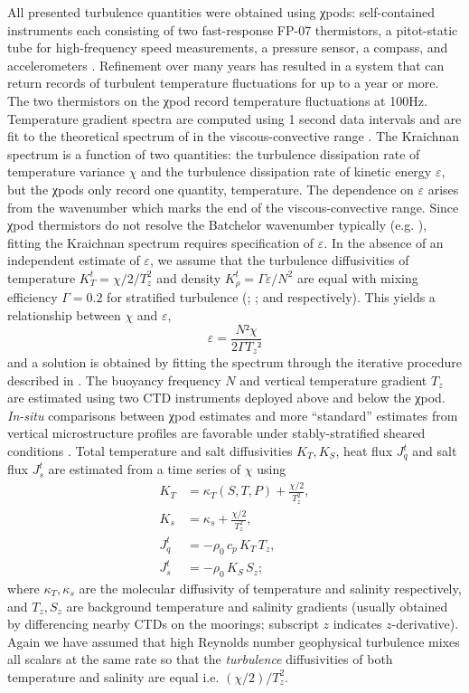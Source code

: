 \documentclass[onecol]{ametsoc}
\begin{document}
All presented turbulence quantities were obtained using χpods: self-contained instruments each consisting of two fast-response FP-07 thermistors, a pitot-static tube for high-frequency speed measurements, a pressure sensor, a compass, and accelerometers \citep{Moum2009a,Moum2015}.
Refinement over many years has resulted in a system that can return records of turbulent temperature fluctuations for up to a year or more.
The two thermistors on the χpod record temperature fluctuations at 100Hz.
Temperature gradient spectra are computed using 1 second data intervals and are fit to the theoretical spectrum of \cite{Kraichnan1968} in the viscous-convective range \citep{Moum2009a}.
The Kraichnan spectrum is a function of two quantities: the turbulence dissipation rate of temperature variance \(χ\) and the turbulence dissipation rate of kinetic energy \(ε\), but the χpods only record one quantity, temperature.
The dependence on \(ε\) arises from the \cite{Batchelor1959} wavenumber which marks the end of the viscous-convective range.
Since χpod thermistors do not resolve the Batchelor wavenumber typically (e.g. \citealp{Lueck1977}), fitting the Kraichnan spectrum requires specification of \(ε\).
In the absence of an independent estimate of \(ε\), we assume that the turbulence diffusivities of temperature  \(K^t_T = χ/2/T_z^2\) and density \(K^t_ρ = Γε/N^2\) are equal with mixing efficiency \(Γ = 0.2\) for stratified turbulence (\citealp{Osborn1972}; \citealp{Osborn1980}; and \citealp{Gregg2018} respectively).
This yields a relationship between \(χ\) and \(ε\), 
\begin{equation}
    \label{eq:eps}
    ε = \frac{N² χ}{2 Γ T_z²}
\end{equation}
and a solution is obtained by fitting the spectrum through the iterative procedure described in \cite{Moum2009a}.
The buoyancy frequency \(N\) and vertical temperature gradient \(T_z\) are estimated using two CTD instruments deployed above and below the χpod.
\emph{In-situ} comparisons between χpod estimates and more ``standard'' estimates from vertical microstructure profiles are favorable under stably-stratified sheared conditions \citep{Perlin2012,Pujiana2018}.
Total temperature and salt diffusivities \(K_T, K_S\), heat flux \(J_q^t\) and salt flux \(J_s^t\) are estimated from a time series of \(χ\) using
\begin{subequations}
\label{eq:def}
 \begin{align}
  K_T &= κ_T(S,T,P) + \frac{χ/2}{T_z^2}, \\
  K_s &= κ_s + \frac{χ/2}{T_z^2}, \\
  J_q^t &= - ρ_0\, c_p\, K_T\, T_z, \\
  J_s^t &= - ρ_0 \, K_S \, S_z;
\end{align}
\end{subequations}
where \(κ_T, κ_s\) are the molecular diffusivity of temperature and salinity respectively, and \(T_z, S_z\) are background temperature and salinity gradients (usually obtained by differencing nearby CTDs on the moorings; subscript \(z\) indicates \(z\)-derivative).
Again we have assumed that high Reynolds number geophysical turbulence mixes all scalars at the same rate so that the \emph{turbulence} diffusivities of both temperature and salinity are equal i.e. \((χ/2)/T_z^2\).
\end{document}
